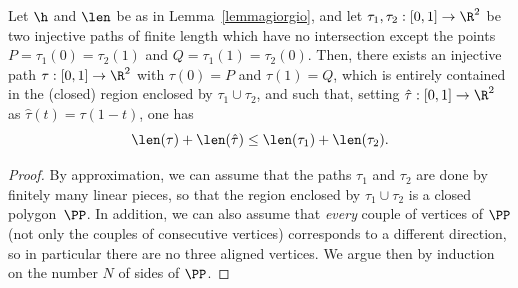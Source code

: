 \begin{cor}\label{helpnolakes}
Let $\h$ and $\len$ be as in Lemma~\ref{lemmagiorgio}, and let $\tau_1,\tau_2:[0,1]\to\R^2$ be two injective paths of finite length which have no intersection except the points $P=\tau_1(0)=\tau_2(1)$ and $Q=\tau_1(1)=\tau_2(0)$. Then, there exists an injective path $\tau:[0,1]\to\R^2$ with $\tau(0)=P$ and $\tau(1)=Q$, which is entirely contained in the (closed) region enclosed by $\tau_1\cup\tau_2$, and such that, setting $\hat\tau:[0,1]\to\R^2$ as $\hat\tau(t)=\tau(1-t)$, one has
\begin{equation}\label{half}
\len(\tau) + \len(\hat\tau) \leq \len(\tau_1)+\len(\tau_2).
\end{equation}
\end{cor}
\begin{proof}
By approximation, we can assume that the paths $\tau_1$ and $\tau_2$ are done by finitely many linear pieces, so that the region enclosed by $\tau_1\cup\tau_2$ is a closed polygon~$\PP$. In addition, we can also assume that \emph{every} couple of vertices of $\PP$ (not only the couples of consecutive vertices) corresponds to a different direction, so in particular there are no three aligned vertices. We argue then by induction on the number $N$ of sides of $\PP$.


\end{proof}
